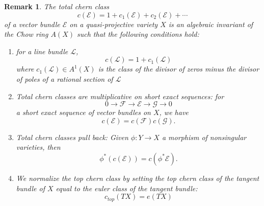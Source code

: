 \documentclass{amsart}
\newtheorem{remark}[theorem]{Remark}
\begin{document}
\begin{remark}
The total chern class \[ c(\mathcal{E}) = 1 + c_1(\mathcal{E}) + c_2(\mathcal{E}) + \cdots \] of a vector bundle $\mathcal{E}$ on a quasi-projective variety $X$ is an algebraic invariant of the Chow ring $A(X)$ such that the following conditions hold:\\
\begin{enumerate}
    \item for a line bundle $\mathcal{L}$, \[ c(\mathcal{L}) = 1 + c_1(\mathcal{L})\] where $c_1(\mathcal{L}) \in A^1(X)$ is the class of the divisor of zeros minus the divisor of poles of a rational section of $\mathcal{L}$ \\
    \item Total chern classes are multiplicative on short exact sequences: for\\
    \[ 0 \rightarrow \mathcal{F} \rightarrow \mathcal{E} \rightarrow \mathcal{G} \rightarrow 0 \] a short exact sequence of vector bundles on $X$, we have \[ c(\mathcal{E}) = c(\mathcal{F})c(\mathcal{G}).\] 
    \item Total chern classes pull back: Given $\phi: Y\rightarrow X$ a morphism of nonsingular varieties, then \[ \phi^*(c(\mathcal{E})) = c(\phi^*\mathcal{E}).\] 
    \item We normalize the top chern class by setting the top chern class of the tangent bundle of $X$ equal to the euler class of the tangent bundle: \[ c_{top}(TX) = e(TX) \] 


\end{enumerate}
\end{remark} 
\end{document}
